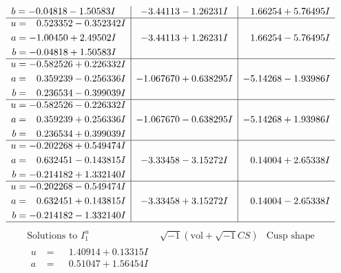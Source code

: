 \documentclass[1p]{elsarticle_modified}
\theoremstyle{definition}
\newcommand{\I}{\sqrt{-1}}
\begin{document}
$$\begin{array}{c|c|c}
\begin{aligned}
b &= -0.04818 - 1.50583 I\end{aligned}
 & -3.44113 - 1.26231 I & \phantom{-}1.66254 + 5.76495 I \\ \hline\begin{aligned}
u &= \phantom{-}0.523352 - 0.352342 I \\
a &= -1.00450 + 2.49502 I \\
b &= -0.04818 + 1.50583 I\end{aligned}
 & -3.44113 + 1.26231 I & \phantom{-}1.66254 - 5.76495 I \\ \hline\begin{aligned}
u &= -0.582526 + 0.226332 I \\
a &= \phantom{-}0.359239 - 0.256336 I \\
b &= \phantom{-}0.236534 - 0.399039 I\end{aligned}
 & -1.067670 + 0.638295 I & -5.14268 - 1.93986 I \\ \hline\begin{aligned}
u &= -0.582526 - 0.226332 I \\
a &= \phantom{-}0.359239 + 0.256336 I \\
b &= \phantom{-}0.236534 + 0.399039 I\end{aligned}
 & -1.067670 - 0.638295 I & -5.14268 + 1.93986 I \\ \hline\begin{aligned}
u &= -0.202268 + 0.549474 I \\
a &= \phantom{-}0.632451 - 0.143815 I \\
b &= -0.214182 + 1.332140 I\end{aligned}
 & -3.33458 - 3.15272 I & \phantom{-}0.14004 + 2.65338 I \\ \hline\begin{aligned}
u &= -0.202268 - 0.549474 I \\
a &= \phantom{-}0.632451 + 0.143815 I \\
b &= -0.214182 - 1.332140 I\end{aligned}
 & -3.33458 + 3.15272 I & \phantom{-}0.14004 - 2.65338 I\\
 \hline 
 \end{array}$$\newpage$$\begin{array}{c|c|c}  
\text{Solutions to }I^u_{1}& \I (\text{vol} + \sqrt{-1}CS) & \text{Cusp shape}\\
 \hline 
\begin{aligned}
u &= \phantom{-}1.40914 + 0.13315 I \\
a &= \phantom{-}0.51047 + 1.56454 I \\

\end{aligned}
\end{array}$$
\end{document}
